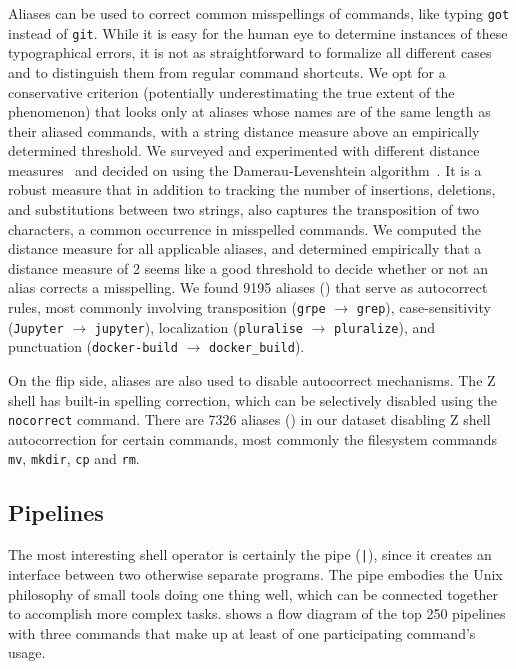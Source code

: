 Aliases can be used to correct common misspellings of commands, like typing \verb|got| instead of \verb|git|.
While it is easy for the human eye to determine instances of these typographical errors, it is not as straightforward to formalize all different cases and to distinguish them from regular command shortcuts.
We opt for a conservative criterion (potentially underestimating the true extent of the phenomenon) that looks only at aliases whose names are of the same length as their aliased commands, with a string distance measure above an empirically determined threshold.
We surveyed and experimented with different distance measures~\cite{navarro:01} and decided on using the Damerau-Levenshtein algorithm~\cite{damerau:64}.
It is a robust measure that in addition to tracking the number of insertions, deletions, and substitutions between two strings, also captures the transposition of two characters, a common occurrence in misspelled commands.
We computed the distance measure for all applicable aliases, and determined empirically that a distance measure of 2 seems like a good threshold to decide whether or not an alias corrects a misspelling.
We found \num{9195} aliases () that serve as autocorrect rules, most commonly involving transposition (\verb|grpe| $\rightarrow$ \verb|grep|), case-sensitivity (\verb|Jupyter| $\rightarrow$ \verb|jupyter|), localization (\verb|pluralise| $\rightarrow$ \verb|pluralize|), and punctuation (\verb|docker-build| $\rightarrow$ \verb|docker_build|).

On the flip side, aliases are also used to disable autocorrect mechanisms.
The Z shell has built-in spelling correction, which can be selectively disabled using the \verb|nocorrect| command.
There are \num{7326} aliases () in our dataset disabling Z shell autocorrection for certain commands, most commonly the filesystem commands \verb|mv|, \verb|mkdir|, \verb|cp| and \verb|rm|.

\subsection{Pipelines}

The most interesting shell operator is certainly the pipe (\verb`|`), since it creates an interface between two otherwise separate programs.
The pipe embodies the Unix philosophy of small tools doing one thing well, which can be connected together to accomplish more complex tasks.
 shows a flow diagram of the top 250 pipelines with three commands that make up at least  of one participating command's usage.

